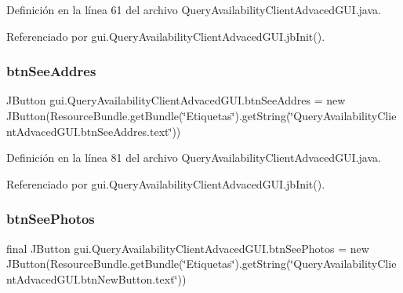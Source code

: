 Definición en la línea 61 del archivo Query\+Availability\+Client\+Advaced\+G\+U\+I.\+java.



Referenciado por gui.\+Query\+Availability\+Client\+Advaced\+G\+U\+I.\+jb\+Init().

\mbox{\label{classgui_1_1_query_availability_client_advaced_g_u_i_ad575bbdc8ef01ae247bcecb682cd281f}} 
\subsubsection{\texorpdfstring{btnSeeAddres}{btnSeeAddres}}
{\footnotesize\ttfamily J\+Button gui.\+Query\+Availability\+Client\+Advaced\+G\+U\+I.\+btn\+See\+Addres = new J\+Button(Resource\+Bundle.\+get\+Bundle(\char`\"{}Etiquetas\char`\"{}).get\+String(\char`\"{}Query\+Availability\+Client\+Advaced\+G\+U\+I.\+btn\+See\+Addres.\+text\char`\"{}))\hspace{0.3cm}{\ttfamily [private]}}



Definición en la línea 81 del archivo Query\+Availability\+Client\+Advaced\+G\+U\+I.\+java.



Referenciado por gui.\+Query\+Availability\+Client\+Advaced\+G\+U\+I.\+jb\+Init().

\mbox{\label{classgui_1_1_query_availability_client_advaced_g_u_i_af3e49155b72ba70bc43512f634a4228f}} 
\subsubsection{\texorpdfstring{btnSeePhotos}{btnSeePhotos}}
{\footnotesize\ttfamily final J\+Button gui.\+Query\+Availability\+Client\+Advaced\+G\+U\+I.\+btn\+See\+Photos = new J\+Button(Resource\+Bundle.\+get\+Bundle(\char`\"{}Etiquetas\char`\"{}).get\+String(\char`\"{}Query\+Availability\+Client\+Advaced\+G\+U\+I.\+btn\+New\+Button.\+text\char`\"{}))\hspace{0.3cm}{\ttfamily [private]}}



